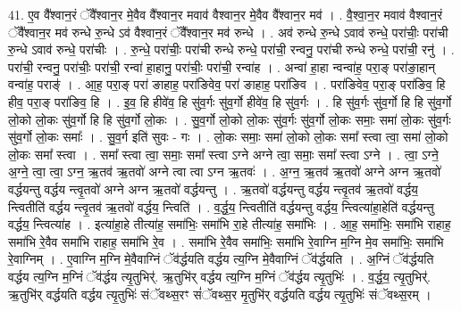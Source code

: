 \documentclass[17pt]{extarticle}
\begin{document}
41. ए॒व वै᳚श्वान॒रं ॅवै᳚श्वान॒र मे॒वैव वै᳚श्वान॒र मवाव॑ वैश्वान॒र मे॒वैव वै᳚श्वान॒र मव॑ । . वै॒श्वा॒न॒र मवाव॑ वैश्वान॒रं ॅवै᳚श्वान॒र मव॑ रुन्धे रु॒न्धे ऽव॑ वैश्वान॒रं ॅवै᳚श्वान॒र मव॑ रुन्धे । . अव॑ रुन्धे रु॒न्धे ऽवाव॑ रुन्धे॒ परा॑चीः॒ परा॑ची रु॒न्धे ऽवाव॑ रुन्धे॒ परा॑चीः । . रु॒न्धे॒ परा॑चीः॒ परा॑ची रुन्धे रुन्धे॒ परा॑ची॒ रन्वनु॒ परा॑ची रुन्धे रुन्धे॒ परा॑ची॒ रनु॑ । . परा॑ची॒ रन्वनु॒ परा॑चीः॒ परा॑ची॒ रन्वा॑ हा॒हानु॒ परा॑चीः॒ परा॑ची॒ रन्वा॑ह । . अन्वा॑ हा॒हा न्वन्वा॑ह॒ परा॒ङ् परा॑ङा॒हान् वन्वा॑ह॒ पराङ्॑ । . आ॒ह॒ परा॒ङ् परा॑ ङाहाह॒ परा॑ङिवेव॒ परा॑ ङाहाह॒ परा॑ङिव । . परा॑ङिवेव॒ परा॒ङ् परा॑ङिव॒ हि हीव॒ परा॒ङ् परा॑ङिव॒ हि । . इ॒व॒ हि हीवे॑व॒ हि सु॑व॒र्गः सु॑व॒र्गो हीवे॑व॒ हि सु॑व॒र्गः । . हि सु॑व॒र्गः सु॑व॒र्गो हि हि सु॑व॒र्गो लो॒को लो॒कः सु॑व॒र्गो हि हि सु॑व॒र्गो लो॒कः । . सु॒व॒र्गो लो॒को लो॒कः सु॑व॒र्गः सु॑व॒र्गो लो॒कः समाः॒ समा॑ लो॒कः सु॑व॒र्गः सु॑व॒र्गो लो॒कः समाः᳚ । . सु॒व॒र्ग इति॑ सुवः - गः । . लो॒कः समाः॒ समा॑ लो॒को लो॒कः समा᳚ स्त्वा त्वा॒ समा॑ लो॒को लो॒कः समा᳚ स्त्वा । . समा᳚ स्त्वा त्वा॒ समाः॒ समा᳚ स्त्वा ऽग्ने अग्ने त्वा॒ समाः॒ समा᳚ स्त्वा ऽग्ने । . त्वा॒ ऽग्ने॒ अ॒ग्ने॒ त्वा॒ त्वा॒ ऽग्न॒ ऋ॒तव॑ ऋ॒तवो॑ अग्ने त्वा त्वा ऽग्न ऋ॒तवः॑ । . अ॒ग्न॒ ऋ॒तव॑ ऋ॒तवो॑ अग्ने अग्न ऋ॒तवो॑ वर्द्धयन्तु वर्द्धय न्त्वृ॒तवो॑ अग्ने अग्न ऋ॒तवो॑ वर्द्धयन्तु । . ऋ॒तवो॑ वर्द्धयन्तु वर्द्धय न्त्वृ॒तव॑ ऋ॒तवो॑ वर्द्धय॒ न्त्वितीति॑ वर्द्धय न्त्वृ॒तव॑ ऋ॒तवो॑ वर्द्धय॒ न्त्विति॑ । . व॒र्द्ध॒य॒ न्त्वितीति॑ वर्द्धयन्तु वर्द्धय॒ न्त्वित्या॑हा॒हेति॑ वर्द्धयन्तु वर्द्धय॒ न्त्वित्या॑ह । . इत्या॑हा॒हे तीत्या॑ह॒ समा॑भिः॒ समा॑भि रा॒हे तीत्या॑ह॒ समा॑भिः । . आ॒ह॒ समा॑भिः॒ समा॑भि राहाह॒ समा॑भि रे॒वैव समा॑भि राहाह॒ समा॑भि रे॒व । . समा॑भि रे॒वैव समा॑भिः॒ समा॑भि रे॒वाग्नि म॒ग्नि मे॒व समा॑भिः॒ समा॑भि रे॒वाग्निम् । . ए॒वाग्नि म॒ग्नि मे॒वैवाग्निं ॅव॑र्द्धयति वर्द्धय त्य॒ग्नि मे॒वैवाग्निं ॅव॑र्द्धयति । . अ॒ग्निं ॅव॑र्द्धयति वर्द्धय त्य॒ग्नि म॒ग्निं ॅव॑र्द्धय त्यृ॒तुभिर्॑. ऋ॒तुभि॑र् वर्द्धय त्य॒ग्नि म॒ग्निं ॅव॑र्द्धय त्यृ॒तुभिः॑ । . व॒र्द्ध॒य॒ त्यृ॒तुभिर्॑. ऋ॒तुभि॑र् वर्द्धयति वर्द्धय त्यृ॒तुभिः॑ संॅवथ्स॒रꣳ सं॑ॅवथ्स॒र मृ॒तुभि॑र् वर्द्धयति वर्द्धय त्यृ॒तुभिः॑ संॅवथ्स॒रम् । \newline
\pagebreak
{}
\end{document}
